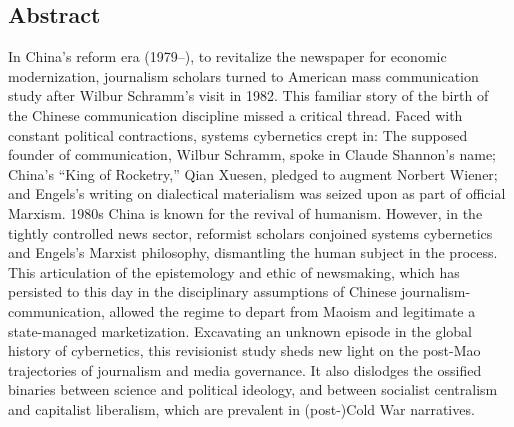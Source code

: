 \documentclass{tufte-handout}
\begin{document}
\begin{titlepage}
\vspace*{1em}

\hypertarget{abstract}{%
\section{Abstract}\label{abstract}}


In China's reform era (1979--), to revitalize the newspaper for economic
modernization, journalism scholars turned to American mass communication
study after Wilbur Schramm's visit in 1982. This familiar story of the
birth of the Chinese communication discipline missed a critical thread.
Faced with constant political contractions, systems cybernetics crept
in: The supposed founder of communication, Wilbur Schramm, spoke in
Claude Shannon's name; China's ``King of Rocketry,'' Qian Xuesen,
pledged to augment Norbert Wiener; and Engels's writing on dialectical
materialism was seized upon as part of official Marxism. 1980s China is
known for the revival of humanism. However, in the tightly controlled
news sector, reformist scholars conjoined systems cybernetics and
Engels's Marxist philosophy, dismantling the human subject in the
process. This articulation of the epistemology and ethic of newsmaking,
which has persisted to this day in the disciplinary assumptions of
Chinese journalism-communication, allowed the regime to depart from
Maoism and legitimate a state-managed marketization. Excavating an
unknown episode in the global history of cybernetics, this revisionist
study sheds new light on the post-Mao trajectories of journalism and
media governance. It also dislodges the ossified binaries between
science and political ideology, and between socialist centralism and
capitalist liberalism, which are prevalent in (post-)Cold War
narratives.





\enlargethispage{2\baselineskip}

\vspace*{2em}



\end{titlepage}
\end{document}
